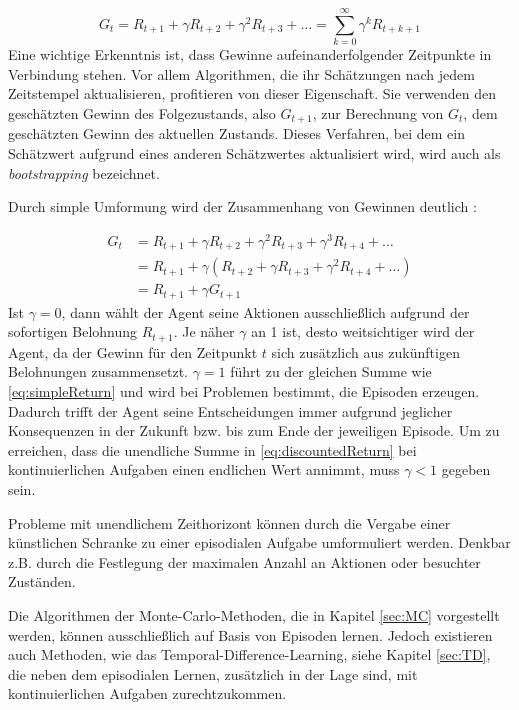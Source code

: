 \begin{equation}\label{eq:discountedReturn}
    G_t = R_{t+1} + \gamma R_{t+2} + \gamma^2 R_{t+3} + \dots  = \sum_{k=0}^\infty{\gamma^k R_{t+k+1}}
\end{equation}
Eine wichtige Erkenntnis ist, dass Gewinne aufeinanderfolgender Zeitpunkte in Verbindung stehen. Vor allem Algorithmen, die ihr Schätzungen nach jedem Zeitstempel aktualisieren, profitieren von dieser Eigenschaft. Sie verwenden den geschätzten Gewinn des Folgezustands, also $G_{t+1}$, zur Berechnung von $G_t$, dem geschätzten Gewinn des aktuellen Zustands. Dieses Verfahren, bei dem ein Schätzwert aufgrund eines anderen Schätzwertes aktualisiert wird, wird auch als \textit{bootstrapping} bezeichnet.  
\par 
Durch simple Umformung wird der Zusammenhang von Gewinnen deutlich \cite[S.55]{Sutton1998}:

\begin{equation}\label{eq:successiveReturn}
    \begin{aligned}
    G_t &= R_{t+1} + \gamma R_{t+2} + \gamma^2 R_{t+3} + \gamma^3 R_{t+4} + \dots \\
    &= R_{t+1} + \gamma (R_{t+2} + \gamma R_{t+3} + \gamma^2 R_{t+4} + \dots)  \\
   & = R_{t+1} + \gamma G_{t+1}
    \end{aligned}
\end{equation}
Ist $\gamma = 0$, dann wählt der Agent seine Aktionen ausschließlich aufgrund der sofortigen Belohnung $R_{t+1}$. Je näher $\gamma$ an 1 ist, desto \glqq weitsichtiger\grqq{} wird der Agent, da der Gewinn für den Zeitpunkt $t$ sich zusätzlich aus zukünftigen Belohnungen zusammensetzt. $\gamma = 1$ führt zu der gleichen Summe wie \eqref{eq:simpleReturn} und wird bei Problemen bestimmt, die Episoden erzeugen. Dadurch trifft der Agent seine Entscheidungen immer aufgrund jeglicher Konsequenzen in der Zukunft bzw. bis zum Ende der jeweiligen Episode. Um zu erreichen, dass die unendliche Summe in \eqref{eq:discountedReturn} bei kontinuierlichen Aufgaben einen endlichen Wert annimmt, muss $\gamma < 1$ gegeben sein.
\par 
Probleme mit unendlichem Zeithorizont können durch die Vergabe einer künstlichen Schranke zu einer episodialen Aufgabe umformuliert werden. Denkbar z.B. durch die Festlegung der maximalen Anzahl an Aktionen oder besuchter Zuständen. 
\par
Die Algorithmen der Monte-Carlo-Methoden, die in Kapitel \ref{sec:MC} vorgestellt werden, können ausschließlich auf Basis von Episoden lernen. Jedoch existieren auch Methoden, wie das Temporal-Difference-Learning, siehe Kapitel \ref{sec:TD}, die neben dem episodialen Lernen, zusätzlich in der Lage sind, mit kontinuierlichen Aufgaben zurechtzukommen. 